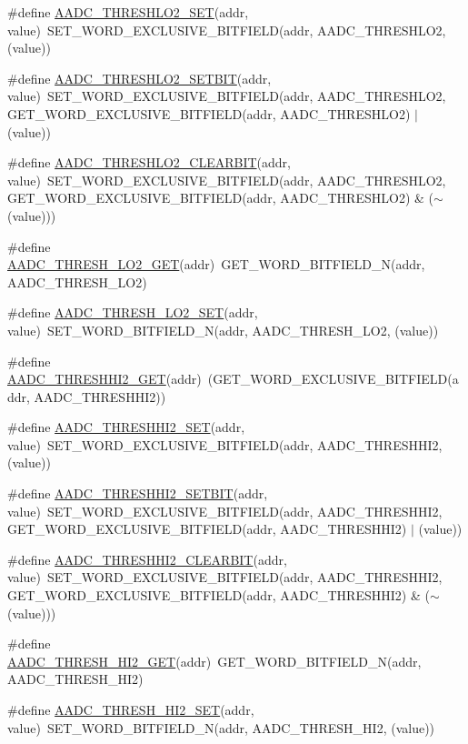 \begin{DoxyCompactItemize}
\#define \hyperlink{a00542_a756d2f52716d2ab72bc2cbb39f34c080}{AADC\_\-THRESHLO2\_\-SET}(addr, value)~SET\_\-WORD\_\-EXCLUSIVE\_\-BITFIELD(addr, AADC\_\-THRESHLO2, (value))
\item 
\#define \hyperlink{a00542_a6bd9e59497a927b85bca26c1871dacec}{AADC\_\-THRESHLO2\_\-SETBIT}(addr, value)~SET\_\-WORD\_\-EXCLUSIVE\_\-BITFIELD(addr, AADC\_\-THRESHLO2, GET\_\-WORD\_\-EXCLUSIVE\_\-BITFIELD(addr, AADC\_\-THRESHLO2) $|$ (value))
\item 
\#define \hyperlink{a00542_a843484f2ce4c9d3a9a1d883fe3cd77ec}{AADC\_\-THRESHLO2\_\-CLEARBIT}(addr, value)~SET\_\-WORD\_\-EXCLUSIVE\_\-BITFIELD(addr, AADC\_\-THRESHLO2, GET\_\-WORD\_\-EXCLUSIVE\_\-BITFIELD(addr, AADC\_\-THRESHLO2) \& ($\sim$(value)))
\item 
\#define \hyperlink{a00542_ad1039e94aca99db5910e93da8f77d04d}{AADC\_\-THRESH\_\-LO2\_\-GET}(addr)~GET\_\-WORD\_\-BITFIELD\_\-N(addr, AADC\_\-THRESH\_\-LO2)
\item 
\#define \hyperlink{a00542_a169176eb9d54cdc3d1457a3ee94b6696}{AADC\_\-THRESH\_\-LO2\_\-SET}(addr, value)~SET\_\-WORD\_\-BITFIELD\_\-N(addr, AADC\_\-THRESH\_\-LO2, (value))
\item 
\#define \hyperlink{a00542_a6ee783a710d29b49991b9e3b27e45f79}{AADC\_\-THRESHHI2\_\-GET}(addr)~(GET\_\-WORD\_\-EXCLUSIVE\_\-BITFIELD(addr, AADC\_\-THRESHHI2))
\item 
\#define \hyperlink{a00542_a37276e0fa105671ee8c3512413b8de7f}{AADC\_\-THRESHHI2\_\-SET}(addr, value)~SET\_\-WORD\_\-EXCLUSIVE\_\-BITFIELD(addr, AADC\_\-THRESHHI2, (value))
\item 
\#define \hyperlink{a00542_abc1c7c5f9b51ebfeb35094a2f88b79d0}{AADC\_\-THRESHHI2\_\-SETBIT}(addr, value)~SET\_\-WORD\_\-EXCLUSIVE\_\-BITFIELD(addr, AADC\_\-THRESHHI2, GET\_\-WORD\_\-EXCLUSIVE\_\-BITFIELD(addr, AADC\_\-THRESHHI2) $|$ (value))
\item 
\#define \hyperlink{a00542_ac059f5fc0805d60075af2d5f11b7972c}{AADC\_\-THRESHHI2\_\-CLEARBIT}(addr, value)~SET\_\-WORD\_\-EXCLUSIVE\_\-BITFIELD(addr, AADC\_\-THRESHHI2, GET\_\-WORD\_\-EXCLUSIVE\_\-BITFIELD(addr, AADC\_\-THRESHHI2) \& ($\sim$(value)))
\item 
\#define \hyperlink{a00542_a1013b4e0010e4a695888a982baaa6775}{AADC\_\-THRESH\_\-HI2\_\-GET}(addr)~GET\_\-WORD\_\-BITFIELD\_\-N(addr, AADC\_\-THRESH\_\-HI2)
\item 
\#define \hyperlink{a00542_a81f2365f422028dc39eb6295b495d638}{AADC\_\-THRESH\_\-HI2\_\-SET}(addr, value)~SET\_\-WORD\_\-BITFIELD\_\-N(addr, AADC\_\-THRESH\_\-HI2, (value))

\end{DoxyCompactItemize}

